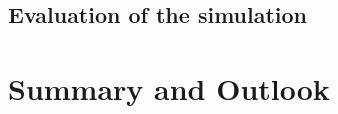 \documentclass[11pt]{article}
\begin{document}
\subsection{Evaluation of the simulation}

\section{Summary and Outlook}





\end{document}

